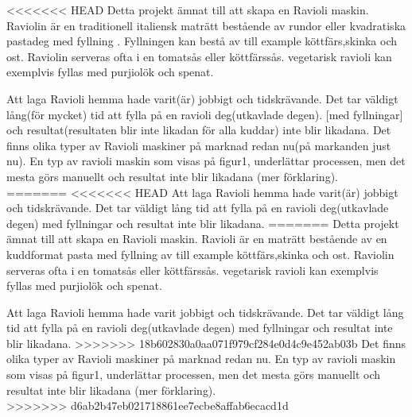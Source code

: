 <<<<<<< HEAD
Detta projekt  ämnat till att skapa en Ravioli maskin. Raviolin är en traditionell italiensk maträtt bestående av rundor eller kvadratiska pastadeg med fyllning \cite{engproc}. Fyllningen kan bestå av till example köttfärs,skinka och ost. Raviolin serveras ofta i en tomatsås eller köttfärssås. vegetarisk ravioli kan exemplvis fyllas med purjiolök och spenat. 

Att laga Ravioli hemma hade varit(är) jobbigt och tidskrävande. Det tar väldigt lång(för mycket) tid att fylla på en ravioli deg(utkavlade degen). [med fyllningar] och resultat(resultaten blir inte likadan för alla kuddar) inte blir likadana.
Det finns olika typer av Ravioli maskiner på marknad redan nu(på markanden just nu). En typ av ravioli maskin som visas på figur1, underlättar processen, men det mesta görs manuellt och resultat inte blir likadana (mer förklaring).\\
=======
<<<<<<< HEAD
Att laga Ravioli hemma hade varit(är) jobbigt och tidskrävande. Det tar väldigt lång tid att fylla på en ravioli deg(utkavlade degen) med fyllningar och resultat inte blir likadana.
=======
Detta projekt  ämnat till att skapa en Ravioli maskin. Ravioli är en maträtt bestående av en kuddformat pasta med fyllning av till example köttfärs,skinka och ost. Raviolin serveras ofta i en tomatsås eller köttfärssås. vegetarisk ravioli kan exemplvis fyllas med purjiolök och spenat. 

Att laga Ravioli hemma hade varit jobbigt och tidskrävande. Det tar väldigt lång tid att fylla på en ravioli deg(utkavlade degen) med fyllningar och resultat inte blir likadana.
>>>>>>> 18b602830a0aa071f979cf284e0d4c9e452ab03b
Det finns olika typer av Ravioli maskiner på marknad redan nu. En typ av ravioli maskin som visas på figur1, underlättar processen, men det mesta görs manuellt och resultat inte blir likadana (mer förklaring).\\
>>>>>>> d6ab2b47eb021718861ee7ecbe8affab6ecacd1d

